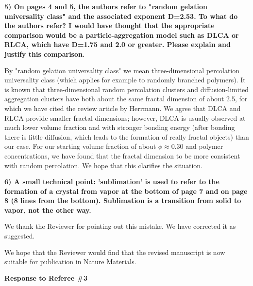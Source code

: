 \documentclass[11pt]{article}
\begin{document}
\vspace{1em}

\singlespacing

{\bf
5) On pages 4 and 5, the authors refer to "random gelation universality class" and the associated exponent D=2.53. To what do the authors refer? I would have thought that the appropriate comparison would be a particle-aggregation model such as DLCA or RLCA, which have D=1.75 and 2.0 or greater. Please explain and justify this comparison.
}




\bigskip
\doublespacing

By "random gelation universality class" we mean three-dimensional percolation universality class (which applies for example to randomly branched polymers).
It is known that three-dimensional random percolation clusters and diffusion-limited aggregation clusters have both about the same fractal dimension of about 2.5, for which we have cited the review article by Herrmann. We agree that DLCA and RLCA provide smaller fractal dimensions; however, DLCA is usually observed at much lower volume fraction and with stronger bonding energy (after bonding there is little diffusion, which leads to the formation of really fractal objects) than our case. For our starting volume fraction of about $\phi\approx 0.30$ and polymer concentrations, we have found that the fractal dimension
to be more consistent with random percolation. We hope that this clarifies the situation.


\vspace{1em}

\singlespacing

{\bf
6) A small technical point: 'sublimation' is used to refer to the formation of a crystal from vapor at the bottom of page 7 and on page 8 (8 lines from the bottom). Sublimation is a transition from solid to vapor, not the other way.
}



\bigskip
\doublespacing

We thank the Reviewer for pointing out this mistake. We have corrected it as suggested. 


We hope that the Reviewer would find that the revised manuscript is now suitable for publication in Nature Materials. 


\clearpage

\noindent
\begin{Large}
{\bf Response to Referee \#3}
\end{Large}
\end{document}
